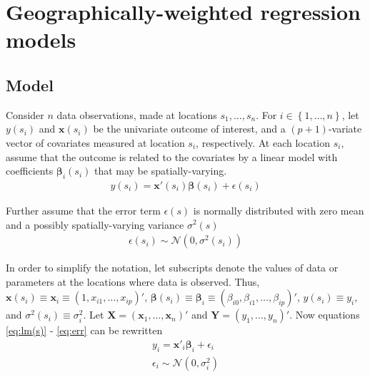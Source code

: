 \documentclass[authoryear, review, 11pt]{elsarticle}
\begin{document}

	
\section{Geographically-weighted regression models \label{section:model}}

	\subsection{Model}
	Consider $n$ data observations, made at locations $s_1, \dots, s_n$. For $i \in \left\{1, \dots, n \right\}$, let $y(s_i)$ and $\bm{x}(s_i)$ be the univariate outcome of interest, and a $(p+1)$-variate vector of covariates measured at location $s_i$, respectively. At each location $s_i$, assume that the outcome is related to the covariates by a linear model with coefficients $\bm{\beta}_i(s_i)$ that may be spatially-varying.
	\begin{eqnarray}
		y(s_i) = \bm{x}'(s_i) \bm{\beta}(s_i) + \epsilon(s_i)
	\label{eq:lm(s)}
	\end{eqnarray}
	
	Further assume that the error term $\epsilon(s)$ is normally distributed with zero mean and a possibly spatially-varying variance $\sigma^2(s)$
	\begin{eqnarray}
		\epsilon(s_i) \sim \mathcal{N} \left( 0,\sigma^2(s_i) \right)
	\label{eq:err}
	\end{eqnarray}
	
	In order to simplify the notation, let subscripts denote the values of data or parameters at the locations where data is observed. Thus, $\bm{x}(s_i) \equiv \bm{x}_i \equiv \left( 1, x_{i1}, \dots, x_{ip} \right)'$, $\bm{\beta}(s_i) \equiv \bm{\beta}_i \equiv \left(\beta_{i0}, \beta_{i1}, \dots, \beta_{ip} \right)'$, $y(s_i) \equiv y_i$, and $\sigma^2(s_i) \equiv \sigma^2_i$. Let $\bm{X} = \left( \bm{x}_1, \dots, \bm{x}_n \right)'$ and $\bm{Y} = \left( y_1, \dots, y_n \right)'$. Now equations \ref{eq:lm(s)} - \ref{eq:err} can be rewritten
	\begin{eqnarray}
		y_i = \bm{x}'_i \bm{\beta}_i + \epsilon_i\\
		\epsilon_i \sim \mathcal{N} \left( 0,\sigma_i^2 \right)
	\end{eqnarray}
	
\end{document}
